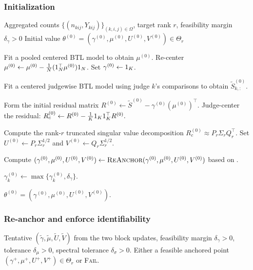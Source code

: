 \documentclass{article}
\begin{document}
\begin{bibunit}[unsrtnat]
\subsubsection{Initialization}
\begin{algorithm}[!ht]
    \caption{\textsc{Initialize}: construct $(\gamma^{(0)},\mu^{(0)},U^{(0)},V^{(0)})$}
    \label{alg:initialize}
    \begin{algorithmic}[1]
    \Require Aggregated counts $\{(n_{kij},Y_{kij})\}_{(k,i,j)\in\Omega}$, target rank $r$, feasibility margin $\delta_\gamma>0$
    \Ensure Initial value $\theta^{(0)}=(\gamma^{(0)},\mu^{(0)},U^{(0)},V^{(0)}) \in \Theta_r$
    
    \State Fit a pooled centered BTL model to obtain $\mu^{(0)}$.
    \State Re-center $\mu^{(0)} \gets \mu^{(0)} - \frac{1}{N}(1_N^\top \mu^{(0)})1_N$.
    \State Set $\gamma^{(0)} \gets 1_K$.
    
        \State Fit a centered judgewise BTL model using judge $k$'s comparisons to obtain $\tilde S^{(0)}_{k,:}$.
    \EndFor
    
    \State Form the initial residual matrix $R^{(0)} \gets \tilde S^{(0)} - \gamma^{(0)}(\mu^{(0)})^\top$.
    \State Judge-center the residual:
    \(
    R_c^{(0)} \gets R^{(0)} - \frac{1}{K}1_K 1_K^\top R^{(0)}.
    \)
    
    \State Compute the rank-$r$ truncated singular value decomposition $R_c^{(0)} \approx P_r \Sigma_r Q_r^\top$.
    \State Set $U^{(0)} \gets P_r \Sigma_r^{1/2}$ and $V^{(0)} \gets Q_r \Sigma_r^{1/2}$.
    
    \State Compute $(\gamma^{(0)},\mu^{(0)},U^{(0)},V^{(0)}) \gets \textsc{ReAnchor}( \gamma^{(0)},\mu^{(0)},U^{(0)},V^{(0)} )$ based on .

    \State $\gamma_k^{(0)} \gets \max\{\gamma_k^{(0)},\delta_\gamma\}$.
    
    \State \Return $\theta^{(0)}=(\gamma^{(0)},\mu^{(0)},U^{(0)},V^{(0)})$.
    \end{algorithmic}
\end{algorithm}





\subsubsection{Re-anchor and enforce identifiability}

\begin{algorithm}[!ht]
    \caption{\textsc{ReAnchor}: canonical re-anchoring with feasibility check}
    \label{alg:reanchor}
    \begin{algorithmic}[1]
    \Require Tentative $(\tilde{\gamma},\tilde{\mu},\tilde{U},\tilde{V})$ from the two block updates, feasibility margin $\delta_\gamma>0$, tolerance $\delta_\mu>0$, spectral tolerance $\delta_\sigma>0$.
    \Ensure Either a feasible anchored point $(\gamma^+,\mu^+,U^+,V^+)\in\Theta_r$ or \textsc{Fail}.


\end{algorithmic}
\end{algorithm}
\end{bibunit}
\end{document}
